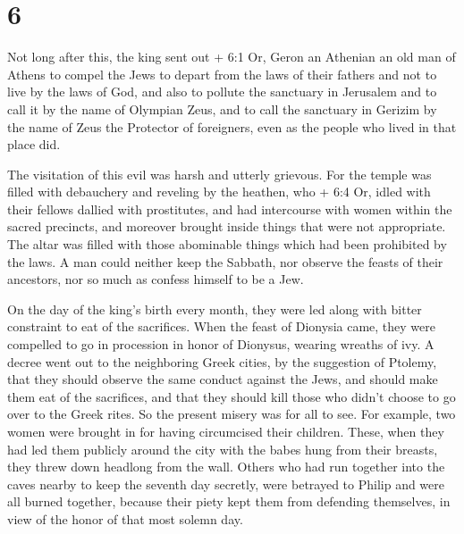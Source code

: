 \hypertarget{section-4}{%
\section{6}\label{section-4}}

 Not long after this, the king sent out + 6:1 Or, Geron an
Athenian an old man of Athens to compel the Jews to depart from the laws
of their fathers and not to live by the laws of God,  and
also to pollute the sanctuary in Jerusalem and to call it by the name of
Olympian Zeus, and to call the sanctuary in Gerizim by the name of Zeus
the Protector of foreigners, even as the people who lived in that place
did.

 The visitation of this evil was harsh and utterly grievous.
 For the temple was filled with debauchery and reveling by
the heathen, who + 6:4 Or, idled with their fellows dallied with
prostitutes, and had intercourse with women within the sacred precincts,
and moreover brought inside things that were not appropriate.
 The altar was filled with those abominable things which had
been prohibited by the laws.  A man could neither keep the
Sabbath, nor observe the feasts of their ancestors, nor so much as
confess himself to be a Jew.

 On the day of the king's birth every month, they were led
along with bitter constraint to eat of the sacrifices. When the feast of
Dionysia came, they were compelled to go in procession in honor of
Dionysus, wearing wreaths of ivy.  A decree went out to the
neighboring Greek cities, by the suggestion of Ptolemy, that they should
observe the same conduct against the Jews, and should make them eat of
the sacrifices,  and that they should kill those who didn't
choose to go over to the Greek rites. So the present misery was for all
to see.  For example, two women were brought in for having
circumcised their children. These, when they had led them publicly
around the city with the babes hung from their breasts, they threw down
headlong from the wall.  Others who had run together into
the caves nearby to keep the seventh day secretly, were betrayed to
Philip and were all burned together, because their piety kept them from
defending themselves, in view of the honor of that most solemn day.

